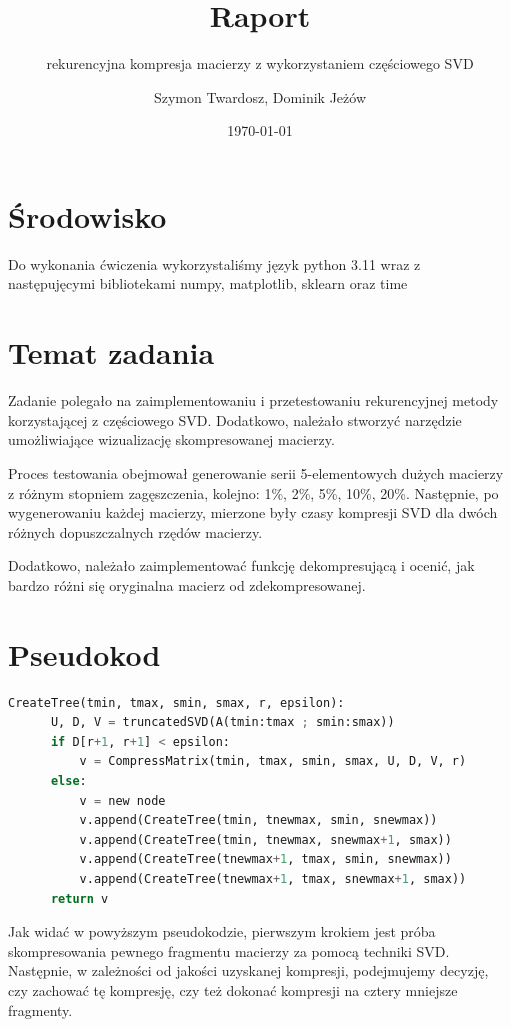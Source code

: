 \documentclass{article}
\title{Raport}
\author{Szymon Twardosz, Dominik Jeżów}
\subtitle{rekurencyjna kompresja macierzy z wykorzystaniem częściowego SVD}
\date{\today}
\begin{document}
\maketitle

\section{\'Srodowisko}
Do wykonania \'cwiczenia wykorzystali\'smy język
python 3.11 wraz z nast\k{e}puj\k{e}cymi bibliotekami
numpy, matplotlib, sklearn oraz time

\section{Temat zadania}

Zadanie polegało na zaimplementowaniu i przetestowaniu rekurencyjnej metody korzystającej z częściowego SVD. Dodatkowo, należało stworzyć narzędzie umożliwiające wizualizację skompresowanej macierzy.

Proces testowania obejmował generowanie serii 5-elementowych dużych macierzy z różnym stopniem zagęszczenia, kolejno: 1\%, 2\%, 5\%, 10\%, 20\%. Następnie, po wygenerowaniu każdej macierzy, mierzone były czasy kompresji SVD dla dwóch różnych dopuszczalnych rzędów macierzy.

Dodatkowo, należało zaimplementować funkcję dekompresującą i ocenić, jak bardzo różni się oryginalna macierz od zdekompresowanej.

\section{Pseudokod}
\begin{lstlisting}[language=Python]
  CreateTree(tmin, tmax, smin, smax, r, epsilon):
      U, D, V = truncatedSVD(A(tmin:tmax ; smin:smax))
      if D[r+1, r+1] < epsilon:
          v = CompressMatrix(tmin, tmax, smin, smax, U, D, V, r)
      else:
          v = new node
          v.append(CreateTree(tmin, tnewmax, smin, snewmax))
          v.append(CreateTree(tmin, tnewmax, snewmax+1, smax))
          v.append(CreateTree(tnewmax+1, tmax, smin, snewmax))
          v.append(CreateTree(tnewmax+1, tmax, snewmax+1, smax))
      return v            
\end{lstlisting}


Jak widać w powyższym pseudokodzie, pierwszym krokiem jest próba skompresowania pewnego fragmentu macierzy za pomocą techniki SVD. Następnie, w zależności od jakości uzyskanej kompresji, podejmujemy decyzję, czy zachować tę kompresję, czy też dokonać kompresji na cztery mniejsze fragmenty.
\end{document}

